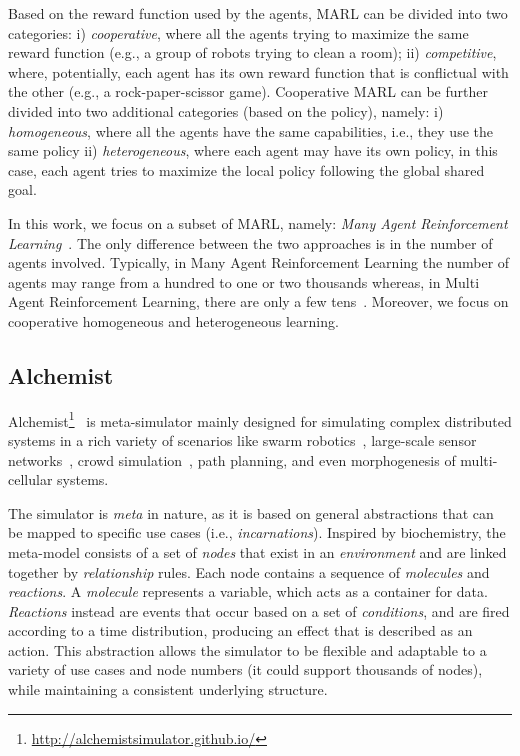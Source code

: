 Based on the reward function used by the agents, MARL can be divided into two categories:
 i) \emph{cooperative}, where all the agents trying to maximize the same reward function (e.g., a group of robots trying to clean a room);
 ii) \emph{competitive}, where, potentially, each agent has its own reward function that is conflictual with the other (e.g., a rock-paper-scissor game).
 Cooperative MARL can be further divided into two additional categories (based on the policy),
 namely:
 i) \emph{homogeneous}, where all the agents have the same capabilities, i.e., they use the same policy
 ii) \emph{heterogeneous}, where each agent may have its own policy, in this case, each agent 
    tries to maximize the local policy following the global shared goal.   

In this work, we focus on a subset of MARL, namely: \emph{Many Agent Reinforcement Learning}~\cite{yang2021many}. 
 The only difference between the two approaches is in the number of agents involved. Typically, in Many Agent Reinforcement Learning the number of agents
 may range from a hundred to one or two thousands whereas, in Multi Agent Reinforcement Learning, there are only a few tens~\cite{smac,marl-curricula}.
 Moreover, we focus on cooperative homogeneous and heterogeneous learning.

\subsection{Alchemist}\label{alchemist}

Alchemist\footnote{\url{http://alchemistsimulator.github.io/}}~\cite{DBLP:journals/jos/PianiniMV13} is meta-simulator
 mainly designed for simulating complex distributed systems 
 in a rich variety of scenarios like swarm robotics~\cite{Casadei2021},
 large-scale sensor networks~\cite{Aguzzi_2022}, crowd simulation~\cite{Beal2015},
 path planning, and even morphogenesis of multi-cellular systems.

The simulator is \emph{meta} in nature, 
 as it is based on general abstractions 
 that can be mapped to specific use cases (i.e., \emph{incarnations}).
% 
Inspired by biochemistry, 
 the meta-model consists of a set of \emph{nodes} 
 that exist in an \emph{environment} and are linked together by \emph{relationship} rules. 
 Each node contains a sequence of \emph{molecules} and \emph{reactions}. 
%
 A \emph{molecule} represents a variable, 
 which acts as a container for data. 
 \emph{Reactions} instead are events that occur based 
 on a set of \emph{conditions}, 
 and are fired according to a time distribution, 
 producing an effect that is described as an action. 
This abstraction allows the simulator to be flexible 
 and adaptable to a variety of use cases and node numbers 
 (it could support thousands of nodes), 
 while maintaining a consistent underlying structure.

